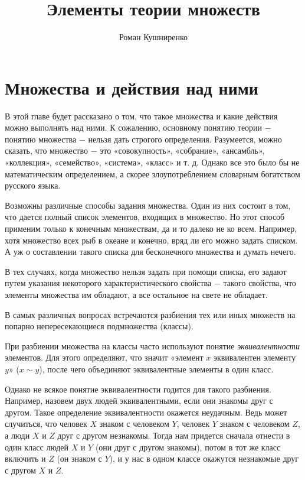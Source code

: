 \documentclass{article}
\title{Элементы теории множеств}
\author{Роман Кушниренко}
\begin{document}
	\maketitle

	\section{Множества и действия над ними}

В этой главе будет рассказано о том, что такое множества и какие действия можно выполнять над ними. К сожалению, основному понятию теории \(-\) понятию множества \(-\) нельзя дать строгого определения. Разумеется, можно сказать, что множество \(-\) это «совокупность», «собрание», «ансамбль», «коллекция», «семейство», «система», «класс» и т. д. Однако все это было бы не математическим определением, а скорее злоупотреблением словарным богатством русского языка. \newline

Возможны различные способы задания множества. Один из них состоит в том, что дается полный список элементов, входящих в множество. Но этот способ применим только к конечным множествам, да и то далеко не ко всем. Например, хотя множество всех рыб в океане и конечно, вряд ли его можно задать списком. А уж о составлении такого списка для бесконечного множества и думать нечего.

В тех случаях, когда множество нельзя задать при помощи списка, его задают путем указания некоторого характеристического свойства \(-\) такого свойства, что элементы множества им обладают, а все остальное на свете не обладает. \newline

В самых различных вопросах встречаются разбиения тех или иных множеств на попарно непересекающиеся подмножества (классы).

При разбиении множества на классы часто используют понятие \textit{эквивалентности} элементов. Для этого определяют, что значит «элемент \(x\) эквивалентен элементу \(y\)» (\(x \sim y\)), после чего объединяют эквивалентные элементы в один класс.

Однако не всякое понятие эквивалентности годится для такого разбиения. Например, назовем двух людей эквивалентными, если они знакомы друг с другом. Такое определение эквивалентности окажется неудачным. Ведь может случиться, что человек \(X\) знаком с человеком \(Y\), человек \(Y\) знаком с человеком \(Z\), а люди \(X\) и \(Z\) друг с другом незнакомы. Тогда нам придется сначала отнести в один класс людей \(X\) и \(Y\) (они друг с другом знакомы), потом в тот же класс включить и \(Z\) (он знаком с \(Y\)), и у нас в одном классе окажутся незнакомые друг с другом \(X\) и \(Z\).
\end{document}
